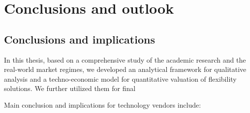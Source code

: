 \chapter{Conclusions and outlook}
\label{conclusion}
%
\section{Conclusions and implications}

In this thesis, based on a comprehensive study of  the academic research and the real-world market regimes, we developed an analytical framework for qualitative analysis and a techno-economic model for quantitative valuation of flexibility solutions. We further utilized them for final 

Main conclusion and implications for technology vendors include:

